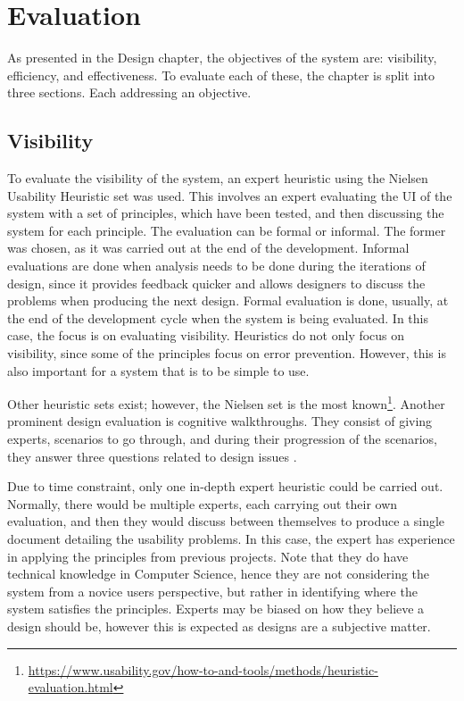 \chapter{Evaluation}
\par As presented in the Design chapter, the objectives of the system are: visibility, efficiency, and effectiveness. To evaluate each of these, the chapter is split into three sections. Each addressing an objective.

\section{Visibility}
\par To evaluate the visibility of the system, an expert heuristic using the Nielsen Usability Heuristic \cite{nielsen1995} set was used. This involves an expert evaluating the UI of the system with a set of principles, which have been tested, and then discussing the system for each principle. The evaluation can be formal or informal. The former was chosen, as it was carried out at the end of the development. Informal evaluations are done when analysis needs to be done during the iterations of design, since it provides feedback quicker and allows designers to discuss the problems when producing the next design. Formal evaluation is done, usually, at the end of the development cycle when the system is being evaluated. In this case, the focus is on evaluating visibility. Heuristics do not only focus on visibility, since some of the principles focus on error prevention. However, this is also important for a system that is to be simple to use.

\par Other heuristic sets exist; however, the Nielsen set is the most known\footnote{\url{https://www.usability.gov/how-to-and-tools/methods/heuristic-evaluation.html}}. Another prominent design evaluation is cognitive walkthroughs. They consist of giving experts, scenarios to go through, and during their progression of the scenarios, they answer three questions related to design issues \cite{whartonriemanlewispolson1994}.

\par Due to time constraint, only one in-depth expert heuristic could be carried out. Normally, there would be multiple experts, each carrying out their own evaluation, and then they would discuss between themselves to produce a single document detailing the usability problems. In this case, the expert has experience in applying the principles from previous projects. Note that they do have technical knowledge in Computer Science, hence they are not considering the system from a novice users perspective, but rather in identifying where the system satisfies the principles. Experts may be biased on how they believe a design should be, however this is expected as designs are a subjective matter.

